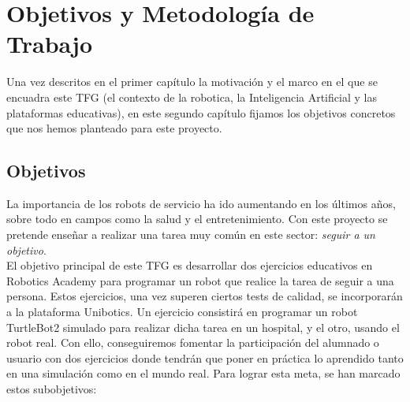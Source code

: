 \chapter{Objetivos y Metodología de Trabajo}
\label{cap:capitulo2}

Una vez descritos en el primer capítulo la motivación y el marco en el que se encuadra este TFG (el contexto de la robotica, la Inteligencia Artificial y las plataformas educativas), en este segundo capítulo fijamos los objetivos concretos que nos hemos planteado para este proyecto.\\

\section{Objetivos}
\label{sec:objetivos}

La importancia de los robots de servicio ha ido aumentando en los últimos años, sobre todo en campos como la salud y el entretenimiento. Con este proyecto se pretende enseñar a realizar una tarea muy común en este sector: \textit{seguir a un objetivo}.\\

El objetivo principal de este TFG es desarrollar dos ejercicios educativos en Robotics Academy para programar un robot que realice la tarea de seguir a una persona. Estos ejercicios, una vez superen ciertos tests de calidad, se incorporarán a la plataforma Unibotics. Un ejercicio consistirá en programar un robot TurtleBot2 simulado para realizar dicha tarea en un hospital, y el otro, usando el robot real. Con ello, conseguiremos fomentar la participación del alumnado o usuario con dos ejercicios donde tendrán que poner en práctica lo aprendido tanto en una simulación como en el mundo real. Para lograr esta meta, se han marcado estos subobjetivos:

